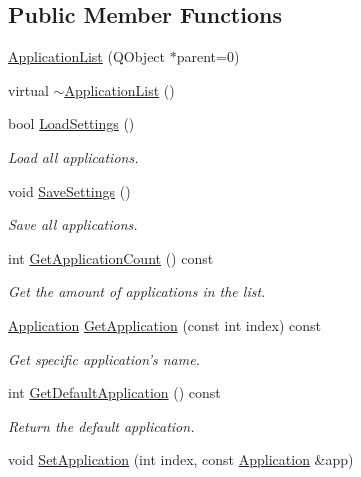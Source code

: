\subsection*{Public Member Functions}
\begin{DoxyCompactItemize}
\item 
\hyperlink{class_application_list_a0efc6a365ff3a7881ddbe0307c037c03}{Application\-List} (Q\-Object $\ast$parent=0)
\item 
virtual \hyperlink{class_application_list_a150490e3f5963dcc8ca0a90e1763b7ae}{$\sim$\-Application\-List} ()
\item 
bool \hyperlink{class_application_list_ae8d7cd833afccb9b1d73b24cd86f8e65}{Load\-Settings} ()
\begin{DoxyCompactList}\small\item\em Load all applications. \end{DoxyCompactList}\item 
void \hyperlink{class_application_list_aa8cd151f9183584630f84ae7cfb4626a}{Save\-Settings} ()
\begin{DoxyCompactList}\small\item\em Save all applications. \end{DoxyCompactList}\item 
int \hyperlink{class_application_list_a59865bd071c64693883edb41f3b033ed}{Get\-Application\-Count} () const 
\begin{DoxyCompactList}\small\item\em Get the amount of applications in the list. \end{DoxyCompactList}\item 
\hyperlink{class_application}{Application} \hyperlink{class_application_list_a2cf23437570b0d2bf404e97c80351d95}{Get\-Application} (const int index) const 
\begin{DoxyCompactList}\small\item\em Get specific application's name. \end{DoxyCompactList}\item 
int \hyperlink{class_application_list_a5b248c1cf7cf9da0ab1220ed7a41eda8}{Get\-Default\-Application} () const 
\begin{DoxyCompactList}\small\item\em Return the default application. \end{DoxyCompactList}\item 
void \hyperlink{class_application_list_a039254c9632556d4ae2e387f1f52dfbe}{Set\-Application} (int index, const \hyperlink{class_application}{Application} \&app)

\end{DoxyCompactItemize}
